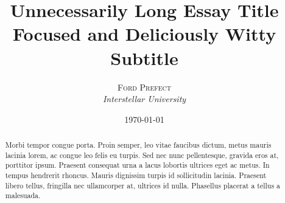 \documentclass[paper=a4, fontsize=10pt]{scrartcl} %
\title{\textbf{Unnecessarily Long Essay Title}\\ %
        Focused and Deliciously Witty Subtitle} %
\author{\textsc{Ford Prefect} %
        \\{\textit{Interstellar University}}} %
\date{\today} %
\makeatletter
\numberwithin{equation}{section} %
\numberwithin{figure}{section} %
\numberwithin{table}{section} %
\renewcommand{\maketitle}{ %
        \begin{flushright} %
        {\LARGE\@title} %

        \vspace{50pt} %

        {\large\@author} %
        \\\@date %

        \vspace{40pt} %
        \end{flushright}
        }
\newcommand{\horrule}[1]{\rule{\linewidth}{#1}} %
\makeatother
\begin{document}
        \restoregeometry %
        \nopagecolor%
        
        
        
        \maketitle
        \begin{abstract}
                Morbi tempor congue porta. Proin semper, leo vitae faucibus dictum, metus mauris lacinia lorem, ac congue leo felis eu turpis. Sed nec nunc pellentesque, gravida eros at, porttitor ipsum. Praesent consequat urna a lacus lobortis ultrices eget ac metus. In tempus hendrerit rhoncus. Mauris dignissim turpis id sollicitudin lacinia. Praesent libero tellus, fringilla nec ullamcorper at, ultrices id nulla. Phasellus placerat a tellus a malesuada.
        \end{abstract}
                
\end{document}
